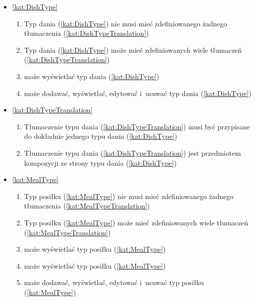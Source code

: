 \begin{itemize}[label={\textbf{Reguły dla}}, wide, labelwidth=!, labelindent=0pt]
\begin{enumerate}[label={\textbf{REG/2/\protect\twodigits{\arabic{enumi}}}}, wide, labelwidth=!, align=left, leftmargin=3cm, resume]
    \end{enumerate}
    \item\ref{kat:DishType}\mynobreakpar
    \begin{enumerate}[label={\textbf{REG/2/\protect\twodigits{\arabic{enumi}}}}, wide, labelwidth=!, align=left, leftmargin=3cm, resume]
        \item Typ dania (\ref{kat:DishType}) nie musi mieć zdefiniowanego żadnego tłumaczenia (\ref{kat:DishTypeTranslation})
        \item Typ dania (\ref{kat:DishType}) może mieć zdefiniowanych wiele tłumaczeń (\ref{kat:DishTypeTranslation})
        \item {} może wyświetlać typ dania (\ref{kat:DishType})
        \item {} może dodawać, wyświetlać, edytować i~usuwać typ dania (\ref{kat:DishType})
    \end{enumerate}
    \item\ref{kat:DishTypeTranslation}\mynobreakpar
    \begin{enumerate}[label={\textbf{REG/2/\protect\twodigits{\arabic{enumi}}}}, wide, labelwidth=!, align=left, leftmargin=3cm, resume]
        \item Tłumaczenie typu dania (\ref{kat:DishTypeTranslation}) musi być przypisane do dokładnie jednego typu dania (\ref{kat:DishType})
        \item Tłumaczenie typu dania (\ref{kat:DishTypeTranslation}) jest przedmiotem kompozycji ze strony typu dania (\ref{kat:DishType})
    \end{enumerate}
    \item\ref{kat:MealType}\mynobreakpar
    \begin{enumerate}[label={\textbf{REG/2/\protect\twodigits{\arabic{enumi}}}}, wide, labelwidth=!, align=left, leftmargin=3cm, resume]
        \item Typ posiłku (\ref{kat:MealType}) nie musi mieć zdefiniowanego żadnego tłumaczenia (\ref{kat:MealTypeTranslation})
        \item Typ posiłku (\ref{kat:MealType}) może mieć zdefiniowanych wiele tłumaczeń (\ref{kat:MealTypeTranslation})
        \item {} może wyświetlać typ posiłku (\ref{kat:MealType})
        \item {} może wyświetlać typ posiłku (\ref{kat:MealType})
        \item {} może dodawać, wyświetlać, edytować i~usuwać typ posiłku (\ref{kat:MealType})

\end{enumerate}
\end{itemize}
